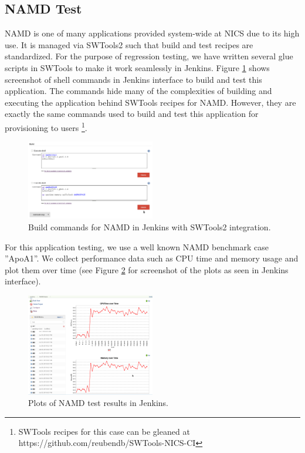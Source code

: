 \documentclass[10pt, conference, compsocconf]{IEEEtran}
\begin{document}
\subsection{NAMD Test}
NAMD is one of many applications provided system-wide at NICS due to its high use. It is managed via SWTools2 \cite{SWTools2} such that build and test recipes are standardized. For the purpose of regression testing, we have written several glue scripts in SWTools to make it work seamlessly in Jenkins. Figure \ref{fig:NAMD-jenkins} shows screenshot of shell commands in Jenkins interface to build and test this application. The commands hide many of the complexities of building and executing the application behind SWTools recipes for NAMD. However, they are exactly the same commands used to build and test this application for provisioning to users \footnote{SWTools recipes for this case can be gleaned at  https://github.com/reubendb/SWTools-NICS-CI}.

\begin{figure}[H]
\centering
\includegraphics[width=0.5\textwidth]{NAMD-Jenkins}
\caption{Build commands for NAMD in Jenkins with SWTools2 integration.}
\label{fig:NAMD-jenkins}
\end{figure}

For this application testing, we use a well known NAMD benchmark case ''ApoA1''. We collect performance data such as CPU time and memory usage and plot them over time (see Figure \ref{fig:NAMDPlot} for screenshot of the plots as seen in Jenkins interface). 

\begin{figure}[H]
\centering
\includegraphics[width=0.5\textwidth]{NAMDPlot}
\caption{Plots of NAMD test results in Jenkins.}
\label{fig:NAMDPlot}
\end{figure}
\end{document}
